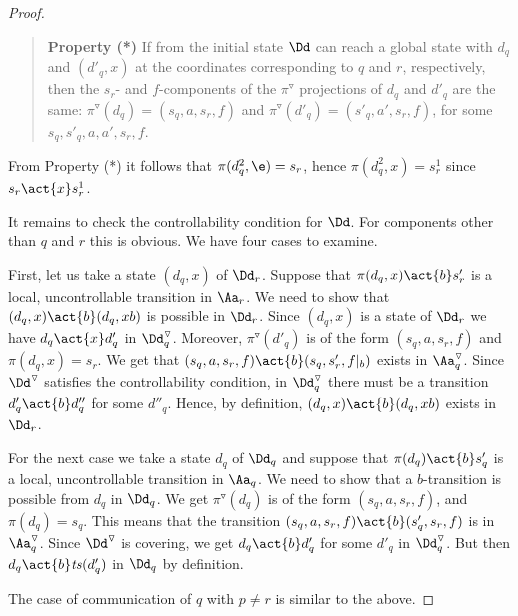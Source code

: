 \documentclass[10pt,a4paper]{article}
\newcommand{\anca}[1]{}
\newcommand{\ts}{\mathit{ts}}
\newcommand{\red}[1]{#1^\triangledown}
\begin{document}
\begin{proof}
  \begin{quote}
    \textbf{Property (*)} If from the initial state $\Dd$ can reach a
  global state with $d_q$ and $(d'_q,x)$ at the coordinates
  corresponding to $q$ and $r$, respectively, then the $s_r$- and $f$-components of the $\red\pi$ projections of $d_q$ and $d'_q$ are the same:
 $\red\pi(d_q)=(s_q,a,s_r,f)$ and
  $\red\pi(d'_q)=(s'_q,a',s_r,f)$, for some $s_q,s'_q,a,a',s_r,f$.

  \end{quote}
  

  From Property (*) it follows that $\pi(d^2_q,\e)=s_r$, hence
  $\pi(d^2_q,x)=s^1_r$ since $s_r\act{x} s^1_r$.

  It remains to check the controllability condition for $\Dd$. For
  components other than $q$ and $r$ this is obvious. 
  We have four cases to examine.

  First, let us take a state $(d_q,x)$ of $\Dd_r$. Suppose that
  $\pi(d_q,x)\act{b}s'_r$ is a local, uncontrollable transition in
  $\Aa_r$. We need to show that $(d_q,x)\act{b}(d_q,xb)$ is possible
  in $\Dd_r$. Since $(d_q,x)$ is a state of $\Dd_r$ we have
  $d_q\act{x}d'_q$ in $\red\Dd_q$. Moreover, $\red\pi(d'_q)$ is of the
  form $(s_q,a,s_r,f)$ and $\pi(d_q,x)=s_r$. We get that
  $(s_q,a,s_r,f)\act{b} (s_q,s'_r,f|_b)$ \anca{changed 2nd f in f'}exists in $\red\Aa_q$.  Since
  $\red\Dd$ satisfies the controllability condition, in $\red\Dd_q$ there must
  be a transition $d'_q\act{b}d''_q$ for some $d''_q$. Hence, by
  definition, $(d_q,x)\act{b}(d_q,xb)$ exists in $\Dd_r$.

  For the next case we take a state $d_q$ of $\Dd_q$ and suppose that
  $\pi(d_q)\act{b} s'_q$ is a local, uncontrollable transition in
  $\Aa_q$. We need to show that a $b$-transition is possible from
  $d_q$ in $\Dd_q$. We get $\red\pi(d_q)$ is of the form $(s_q,a,s_r,f)$, and
  $\pi(d_q)=s_q$. This means that the transition
  $(s_q,a,s_r,f)\act{b}(s'_q,s_r,f)$ is in $\red\Aa_q$. Since
  $\red\Dd$ is covering, we get $d_q\act{b}d'_q$ for some $d'_q$ in
  $\red\Dd_q$. But then $d_q\act{b}\ts(d'_q)$ in $\Dd_q$ by
  definition.

  The case of communication of $q$ with $p\not=r$ is similar to the
  above.


\end{proof}
\end{document}
